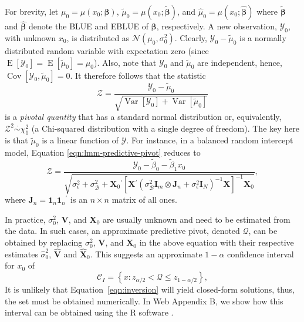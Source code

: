 \documentclass[useAMS,usenatbib,usegraphicx,referee]{biom}\usepackage[]{graphicx}\usepackage[]{color}
\newcommand{\E}{\operatorname{E}}
\newcommand{\var}{\operatorname{Var}}
\newcommand{\cov}{\operatorname{Cov}}
\newcommand{\trans}{\ensuremath{^\prime}}
\newcommand{\proglang}[1]{\textsf{#1}}
\newcommand{\X}{\ensuremath{\bm{X}}}
\begin{document}
For brevity, let $\mu_0 = \mu(x_0; \bm{\beta})$, $\widetilde{\mu}_0 = \mu(x_0; \widetilde{\bm{\beta}})$, and $\widehat{\mu}_0 = \mu(x_0; \widehat{\bm{\beta}})$ where $\widetilde{\bm{\beta}}$ and $\widehat{\bm{\beta}}$ denote the BLUE and EBLUE of $\bm{\beta}$, respectively. A new observation, $\mathscr{Y}_0$, with unknown $x_0$, is distributed as $\mathcal{N}\left(\mu_0, \sigma_0^2\right)$. Clearly, $\mathscr{Y}_0 - \widetilde{\mu}_0$ is a normally distributed random variable with expectation zero (since $\E\left[\mathscr{Y}_0\right] = \E\left[\widetilde{\mu}_0\right] = \mu_0$). Also, note that $\mathscr{Y}_0$ and $\widetilde{\mu}_0$ are independent, hence, $\cov\left[\mathscr{Y}_0, \widetilde{\mu}_0\right] = 0$. It therefore follows that the statistic 
\begin{equation}
\label{eqn:lmm-predictive-pivot}
  \mathcal{Z} = \frac{\mathscr{Y}_0 - \widetilde{\mu}_0}{\sqrt{\var\left[\mathscr{Y}_0\right] + \var\left[\widetilde{\mu}_0\right]}} %
\end{equation}
is a \textit{pivotal quantity} that has a standard normal distribution or, equivalently, $\mathcal{Z}^2 \stackrel{\cdot}{\sim} \chi_1^2$ (a Chi-squared distribution with a single degree of freedom). The key here is that $\widetilde{\mu}_0$ is a linear function of $\bm{\mathscr{Y}}$. For instance, in a balanced random intercept model, Equation \eqref{eqn:lmm-predictive-pivot} reduces to
\[
  \mathcal{Z} = \frac{\mathscr{Y}_0 - \widetilde{\beta}_0 - \widetilde{\beta}_1 x_0}{\sqrt{\sigma_\epsilon^2 + \sigma_\mathscr{B}^2 + \X_0\trans\left[\X\trans\left( \sigma_\mathscr{B}^2\bm{I}_m \otimes \bm{J}_n + \sigma_\epsilon^2\bm{I}_N \right)^{-1}\X\right]^{-1}\X_0}},
\]
where $\bm{J}_n = \bm{1}_n\bm{1}_n\trans$ is an $n \times n$ matrix of all ones.

In practice, $\sigma_0^2$, $\bm{V}$, and $\X_0$ are usually unknown and need to be estimated from the data. In such cases, an approximate predictive pivot, denoted $\mathcal{Q}$, can be obtained by replacing $\sigma_0^2$, $\bm{V}$, and $\X_0$ in the above equation with their respective estimates $\widehat{\sigma}_0^2$, $\widehat{\bm{V}}$ and $\widehat{\X}_0$. This suggests an approximate $1-\alpha$ confidence interval for $x_0$ of
\begin{equation}
\label{eqn:inversion}
  \mathcal{C}_I = \left\{ x: z_{\alpha/2} < \mathcal{Q} \le z_{1-\alpha/2} \right\},
\end{equation}
It is unlikely that Equation~\eqref{eqn:inversion} will yield closed-form solutions, thus, the set must be obtained numerically. In Web Appendix B, we show how this interval can be obtained using the \proglang{R} software \citep{Rlang}.
\end{document}

